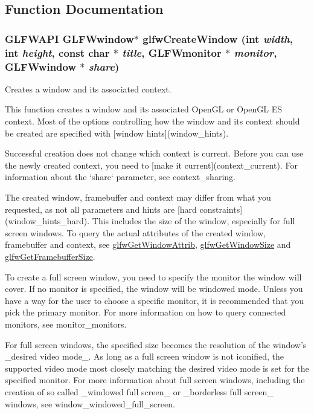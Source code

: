 \subsection{Function Documentation}
\hypertarget{group__window_g680a02abe0e4494b6759d5703240713e}{
\subsubsection[glfwCreateWindow]{\setlength{\rightskip}{0pt plus 5cm}GLFWAPI {\bf GLFWwindow}$\ast$ glfwCreateWindow (int {\em width}, \/  int {\em height}, \/  const char $\ast$ {\em title}, \/  {\bf GLFWmonitor} $\ast$ {\em monitor}, \/  {\bf GLFWwindow} $\ast$ {\em share})}}
\label{group__window_g680a02abe0e4494b6759d5703240713e}


Creates a window and its associated context. 

This function creates a window and its associated OpenGL or OpenGL ES context. Most of the options controlling how the window and its context should be created are specified with \mbox{[}window hints\mbox{]}(window\_\-hints).

Successful creation does not change which context is current. Before you can use the newly created context, you need to \mbox{[}make it current\mbox{]}(context\_\-current). For information about the `share` parameter, see context\_\-sharing.

The created window, framebuffer and context may differ from what you requested, as not all parameters and hints are \mbox{[}hard constraints\mbox{]}(window\_\-hints\_\-hard). This includes the size of the window, especially for full screen windows. To query the actual attributes of the created window, framebuffer and context, see \hyperlink{group__window_g1bb0c7e100418e284dbb800789c63d40}{glfwGetWindowAttrib}, \hyperlink{group__window_g7feb769ebb3f3d21579b5a3fb07be76e}{glfwGetWindowSize} and \hyperlink{group__window_gf7d17f3534b4b6dc9a6f905e3a240b7e}{glfwGetFramebufferSize}.

To create a full screen window, you need to specify the monitor the window will cover. If no monitor is specified, the window will be windowed mode. Unless you have a way for the user to choose a specific monitor, it is recommended that you pick the primary monitor. For more information on how to query connected monitors, see monitor\_\-monitors.

For full screen windows, the specified size becomes the resolution of the window's \_\-desired video mode\_\-. As long as a full screen window is not iconified, the supported video mode most closely matching the desired video mode is set for the specified monitor. For more information about full screen windows, including the creation of so called \_\-windowed full screen\_\- or \_\-borderless full screen\_\- windows, see window\_\-windowed\_\-full\_\-screen.

